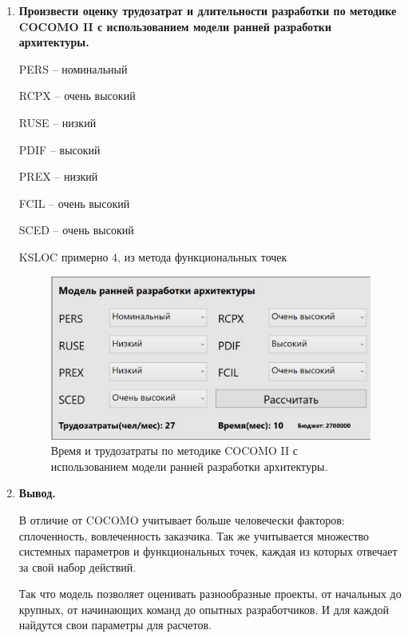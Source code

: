 \documentclass[a4paper,14pt]{extreport} %
\begin{document}
\begin{enumerate}
\item \textbf{Произвести оценку трудозатрат и длительности разработки по методике COCOMO II с использованием модели ранней разработки архитектуры.}

PERS -- номинальный

RCPX -- очень высокий

RUSE -- низкий

PDIF -- высокий

PREX -- низкий

FCIL -- очень высокий

SCED -- очень высокий

KSLOC примерно 4, из метода функциональных точек

 \begin{figure}[H]
  \centering
  \caption{Время и трудозатраты по методике COCOMO II с использованием модели ранней разработки архитектуры. }
  \includegraphics[scale=0.4]{early.jpg}
\end{figure}

\item \textbf{Вывод.}

В отличие от COCOMO учитывает больше человечески факторов: сплоченность, вовлеченность заказчика. Так же учитывается множество системных параметров и функциональных точек, каждая из которых отвечает за свой набор действий.

Так что модель позволяет оценивать разнообразные проекты, от начальных до крупных, от начинающих команд до опытных разработчиков. И для каждой найдутся свои параметры для расчетов.

\end{enumerate}
\end{document}
